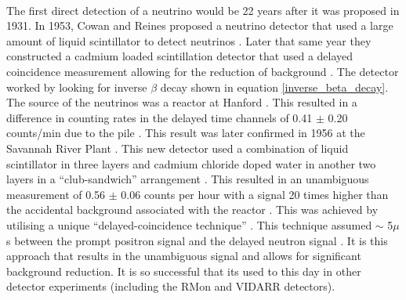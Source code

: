 \\The first direct detection of a neutrino would be 22 years after it was proposed in 1931. In 1953, Cowan and Reines proposed a neutrino detector that used a large amount of liquid scintillator to detect neutrinos \cite{reines1953proposed}. Later that same year they constructed a cadmium loaded scintillation detector that used a delayed coincidence measurement allowing for the reduction of background \cite{reines1953proposed} \cite{reines1953detection}. The detector worked by looking for inverse $\beta$ decay shown in equation \ref{inverse_beta_decay}. The source of the neutrinos was a reactor at Hanford \cite{reines1953detection}. This resulted in a difference in counting rates in the delayed time channels of 0.41 $\pm$ 0.20 counts/min due to the pile \cite{reines1953detection}. This result was later confirmed in 1956 at the Savannah River Plant \cite{Cowan1956Confirmation}. This new detector used a combination of liquid scintillator in three layers and cadmium chloride doped water in another two layers in a ``club-sandwich'' arrangement \cite{Cowan1956Confirmation}. This resulted in an unambiguous measurement of 0.56 $\pm$ 0.06 counts per hour with a signal 20 times higher than the accidental background associated with the reactor \cite{Cowan1956Confirmation}. This was achieved by utilising a unique ``delayed-coincidence technique'' \cite{reines1953detection}. This technique assumed $\sim$ 5$\mu$s between the prompt positron signal and the delayed neutron signal \cite{reines1953detection}. It is this approach that results in the unambiguous signal and allows for significant background reduction. It is so successful that its used to this day in other detector experiments (including the RMon and VIDARR detectors).
